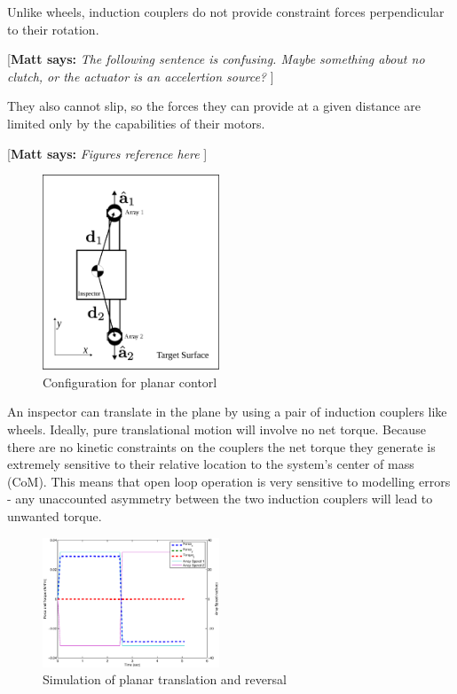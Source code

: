 \documentclass[letterpaper, 10 pt, conference]{ieeeconf}  %
\newcommand{\matt}[1]{{\color{darkgreen}\small\par {[{\bf Matt says:} {\em #1}} ] \\    }}
\begin{document}
Unlike wheels, induction couplers do not provide constraint forces perpendicular to their rotation.  \matt{The following sentence is confusing. Maybe something about no clutch, or the actuator is an accelertion source?}They also cannot slip, so the forces they can provide at a given distance are limited only by the capabilities of their motors. 
%

\matt{Figures reference here}
 
   \begin{figure}[thpb]
      \centering
      \includegraphics[width = 0.47\textwidth]{figures/surface_locomotion.eps}
      \caption{Configuration for planar contorl}
      \label{fig:planarsetup}
   \end{figure}

  An inspector can translate in the plane by using a pair of induction couplers like wheels. Ideally, pure translational motion will involve no net torque. Because there are no kinetic constraints on the couplers the net torque they generate is extremely sensitive to their relative location to the system's center of mass (CoM)\label{def:com}. This means that open loop operation is very sensitive to modelling errors - any unaccounted asymmetry between the two induction couplers will lead to unwanted torque.
  
     \begin{figure}[thpb]
      	\centering
  		\includegraphics[width = 0.47\textwidth]{figures/planar_translation.eps}
      		\caption{Simulation of planar translation and reversal}
      		\label{fig:planartranslation}
   \end{figure}
\end{document}
